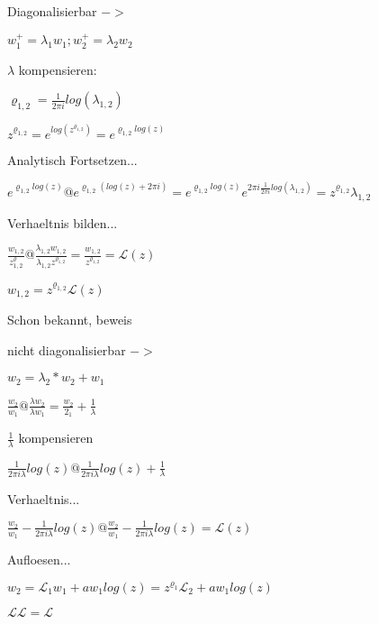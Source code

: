 \documentclass[notes=only]{beamer}
\begin{document}
\note[itemize]
{
	\item Diagonalisierbar $->$
	\item $w_1^+ = \lambda_1 w_1; w_2^+ = \lambda_2 w_2$
	\item $\lambda$ kompensieren:
	\item $\varrho_{1,2} = \frac{1}{2\pi i}log(\lambda_{1,2})$
	\item $z^{\varrho_{1,2}} = e^{log(z^{\varrho_{1,2}})} = e^{\varrho_{1,2} log(z)}$
	\item Analytisch Fortsetzen...
	\item $e^{\varrho_{1,2} log(z)}  \text{@}  e^{\varrho_{1,2} (log(z) + 2\pi i)}
			= e^{\varrho_{1,2} log(z)}  e^{2\pi i\frac{1}{2\pi i}log(\lambda_{1,2})}
			= z^{\varrho_{1,2}}  \lambda_{1,2}$
	\item Verhaeltnis bilden...
	\item $\frac{w_{1,2}}{z^\varrho_{1,2}} @
		\frac{\lambda_{1,2}w_{1,2}}{\lambda_{1,2}z^{\varrho_{1,2}}}
		=\frac{w_{1,2}}{z^{\varrho_{1,2}}} = \mathcal{L}(z)$
	\item $w_{1,2} = z^{\varrho_{1,2}}\mathcal{L}(z)$
	\item Schon bekannt, beweis
	
}
\note[itemize]
{
	\item nicht diagonalisierbar $->$
	\item $w_2 = \lambda_2*w_2 + w_1$
	\item $\frac{w_2}{w_1} @ \frac{\lambda w_2}{\lambda w_1} = \frac{w_2}{2_1}
		+ \frac{1}{\lambda}$
	\item $\frac{1}{\lambda}$ kompensieren
	\item $\frac{1}{2\pi i\lambda} log(z) @\frac{1}{2\pi i\lambda} log(z)
		 +  \frac{1}{\lambda}$
	\item Verhaeltnis...
	\item $\frac{w_2}{w_1} - \frac{1}{2\pi i\lambda} log(z)
		@ \frac{w_2}{w_1} - \frac{1}{2\pi i\lambda} log(z) = \mathcal{L}(z)$
	\item Aufloesen...
	\item $w_2 = \mathcal{L}_1w_1 + aw_1log(z) = z^{\varrho_1}\mathcal{L}_2 + aw_1log(z)$
	\item $\mathcal{L}\mathcal{L}=\mathcal{L}$
}
\end{document}
